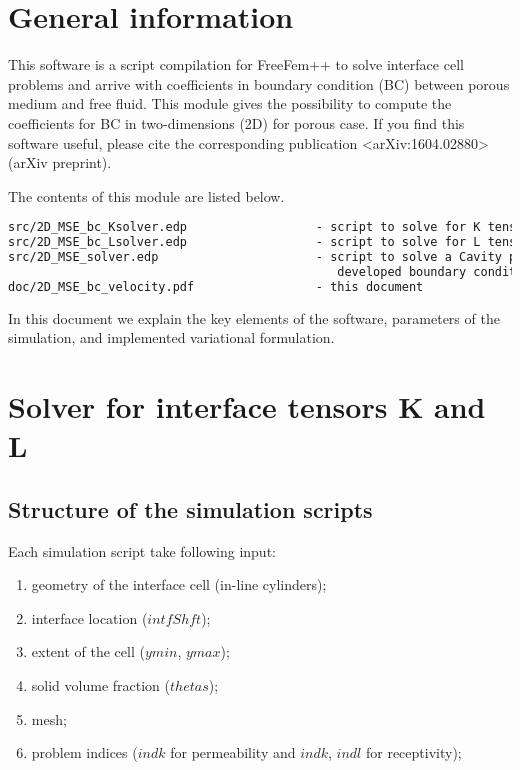 \documentclass[12pt,a4paper]{article}
\begin{document}
\sloppy

\section{General information}

This software is a script compilation for FreeFem++ to solve interface cell problems and arrive with coefficients in boundary condition (BC) between porous medium and free fluid. This module gives the possibility to compute the coefficients for BC in two-dimensions (2D) for porous case. If you find this software useful, please cite the corresponding publication <arXiv:1604.02880> (arXiv preprint).

The contents of this module are listed below.
\begin{lstlisting}[language=tex]
src/2D_MSE_bc_Ksolver.edp                  - script to solve for K tensor
src/2D_MSE_bc_Lsolver.edp                  - script to solve for L tensor
src/2D_MSE_solver.edp                      - script to solve a Cavity problem with
                                              developed boundary conditions
doc/2D_MSE_bc_velocity.pdf                 - this document
\end{lstlisting}

In this document we explain the key elements of the software, parameters of the simulation, and implemented variational formulation.

\section{Solver for interface tensors K and L}

\subsection{Structure of the simulation scripts}

Each simulation script take following input:
\begin{enumerate}
    \item geometry of the interface cell (in-line cylinders);
	\item interface location ($intfShft$);
    \item extent of the cell ($ymin$, $ymax$);
    \item solid volume fraction ($thetas$);
    \item mesh;
    \item problem indices ($indk$ for permeability and $indk$, $indl$ for receptivity);
\end{enumerate}
\end{document}
